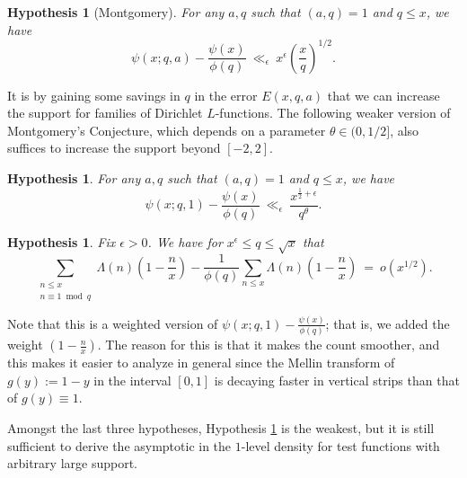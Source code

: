\documentclass[12pt,reqno]{amsart}
\numberwithin{equation}{section}
\theoremstyle{plain}
\newtheorem{hypothesis}[thm]{Hypothesis}
\begin{document}
\begin{hypothesis}[Montgomery]
\label{montgomery original}
For any $a,q$ such that $(a,q)=1$ and $q\leq x$, we have
\begin{equation} \psi(x;q,a)-\frac {\psi(x)}{\phi(q)}\ \ll_{\epsilon}\ x^{\epsilon} \left( \frac xq\right)^{1/2}.  \end{equation}
\end{hypothesis}

It is by gaining some savings in $q$ in the error $E(x,q,a)$ that we can increase the support for families of Dirichlet $L$-functions. The following weaker version of Montgomery's Conjecture, which depends on a parameter $\theta \in (0, 1/2]$, also suffices to increase the support beyond $[-2, 2]$.

\begin{hypothesis}
\label{montgomery weaker}
For any $a,q$ such that $(a,q)=1$ and $q\leq x$, we have
\begin{equation} \psi(x;q,1)-\frac {\psi(x)}{\phi(q)}\ \ll_{\epsilon}\ \frac{x^{\frac 12+\epsilon}}{q^{\theta}} .  \end{equation}
\end{hypothesis}

\begin{hypothesis}
\label{montgomery weakest}
Fix $\epsilon>0$. We have for $x^{\epsilon}\leq q\leq \sqrt x$ that
\begin{equation} \sum_{\substack{n\leq x \\ n\equiv 1\bmod q}} \Lambda(n)\left( 1-\frac nx\right)-\frac{1}{\phi(q)}\sum_{n\leq x}\Lambda(n)\left( 1-\frac nx\right) \ = \ o( x^{1/2}).
\label{small o equation}
\end{equation}
\end{hypothesis}

Note that this is a weighted version of $\psi(x;q,1)-\frac{\psi(x)}{\phi(q)}$; that is, we added the weight $\left( 1-\frac nx\right)$. The reason for this is that it makes the count smoother, and this makes it easier to analyze in general since the Mellin transform of $g(y):=1-y$ in the interval $[0,1]$ is decaying faster in vertical strips than that of $g(y)\equiv 1$.

Amongst the last three hypotheses, Hypothesis \ref{montgomery weakest} is the weakest, but it is still sufficient to derive the asymptotic in the $1$-level density for test functions with arbitrary large support.
\end{document}
